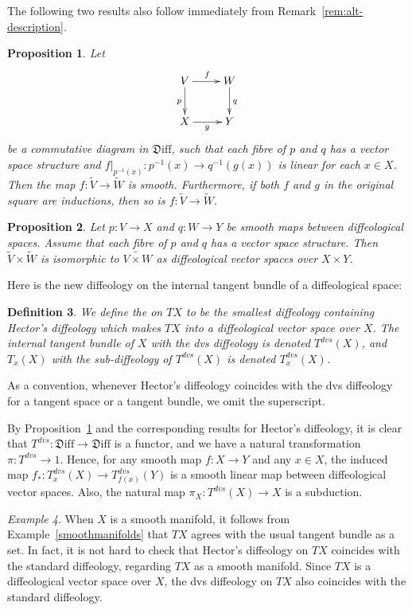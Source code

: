 \documentclass[12pt]{amsart}
\newcommand{\dfn}[1]{\textbf{\boldmath{#1}}}
\newtheorem{de}{Definition}[section]
\newtheorem{prop}[de]{Proposition}
\theoremstyle{remark}
\newtheorem{ex}[de]{Example}
\newcommand{\ra}{\to}
\newcommand{\Diff}{{\mathfrak{D}\mathrm{iff}}}
\begin{document}
The following two results also follow immediately from Remark~\ref{rem:alt-description}.

\begin{prop}\label{prop:Hectortodvs}
Let
\[
\xymatrix{V \ar[r]^f \ar[d]_p & W \ar[d]^q \\ X \ar[r]_g & Y}
\]
be a commutative diagram in $\Diff$, such that each fibre of $p$ and $q$
has a vector space structure and $f|_{p^{-1}(x)}:p^{-1}(x) \ra q^{-1}(g(x))$
is linear for each $x \in X$.
Then the map $f: \widetilde{V} \ra \widetilde{W}$ is smooth.
Furthermore, if both $f$ and $g$ in the original square are inductions,
then so is $f: \widetilde{V} \ra \widetilde{W}$.
\end{prop}

\begin{prop}\label{pr:dvs-product}
Let $p:V \ra X$ and $q:W \ra Y$ be smooth maps between diffeological spaces.
Assume that each fibre of $p$ and $q$ has a vector space structure.
Then $\widetilde{V} \times \widetilde{W}$ is isomorphic to
$\widetilde{V \times W}$ as diffeological vector spaces over $X \times Y$.
\end{prop}

Here is the new diffeology on the internal tangent bundle of a diffeological space:

\begin{de}\label{def:dvsdiffeology}
We define the \dfn{dvs diffeology} on $TX$ to be the smallest diffeology containing
Hector's diffeology which makes $TX$ into a diffeological vector space over $X$.
The internal tangent bundle of $X$ with the dvs diffeology is denoted $T^{dvs}(X)$,
and $T_x(X)$ with the sub-diffeology of $T^{dvs}(X)$ is denoted $T_x^{dvs}(X)$.
\end{de}

As a convention, whenever Hector's diffeology coincides with the dvs diffeology
for a tangent space or a tangent bundle, we omit the superscript.

\smallskip

By Proposition~\ref{prop:Hectortodvs} and
the corresponding results for Hector's diffeology,
it is clear that $T^{dvs}:\Diff \ra \Diff$ is a functor,
and we have a natural transformation $\pi:T^{dvs} \ra 1$.
Hence, for any smooth map $f:X \ra Y$ and any $x \in X$,
the induced map $f_*: T_x^{dvs}(X) \ra T_{f(x)}^{dvs}(Y)$
is a smooth linear map between diffeological vector spaces.
Also, the natural map $\pi_X:T^{dvs}(X) \ra X$ is a subduction.

\begin{ex}
When $X$ is a smooth manifold, it follows from Example~\ref{smoothmanifolds} that
$TX$ agrees with the usual tangent bundle as a set.
In fact, it is not hard to check that
Hector's diffeology on $TX$ coincides with the standard diffeology,
regarding $TX$ as a smooth manifold.
Since $TX$ is a diffeological vector space over $X$,
the dvs diffeology on $TX$ also coincides with the standard diffeology.
\end{ex}
\end{document}
